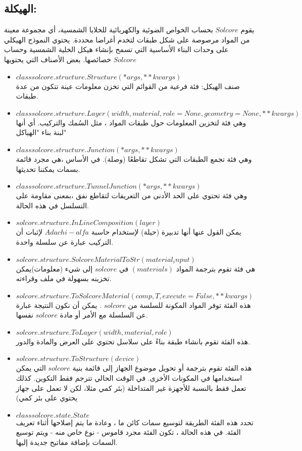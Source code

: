 \subsection{الهيكلة:}
يقوم $ Solcore $ بحساب الخواص الضوئية والكهربائية للخلايا الشمسية، أي مجموعة معينة من المواد مرصوصة على شكل طبقات لتخدم أغراضا محددة. يحتوي النموذج الهيكلي على وحدات البناء الأساسية التي تسمح بإنشاء هيكل الخلية الشمسية وحساب خصائصها.
بعض الأصناف التي يحتويها $ Solcore $ 
\begin{itemize}
	\item $ class solcore.structure.Structure(*args, **kwargs) $
	\\ صنف الهيكل: فئة فرعية من القوائم التي تخزن معلومات عينة تتكون من عدة طبقات.
	\item $ class solcore.structure.Layer(width, material, role=None, geometry=None, **kwargs) $
	\\وهي فئة لتخزين المعلومات حول طبقات المواد ، مثل السُمك والتركيب. أي أنها لبنة بناء "الهياكل"
	\item $ class solcore.structure.Junction(*args, **kwargs) $
	\\وهي فئة تجمع الطبقات التي تشكل تقاطعًا (وصلة). في الأساس ،هي مجرد قائمة بسمات يمكننا تحديثها.
	\item $ class solcore.structure.TunnelJunction(*args, **kwargs) $
	\\وهي فئة تحتوي على الحد الأدنى من التعريفات لتقاطع نفق ،بمعنى مقاومة على التسلسل في هذه الحالة.
	\item $ solcore.structure.InLineComposition(layer) $
	\\يمكن القول عنها أنها تدبيرة (حيلة) لإستخدام حاسبة $ Adachi-alfa $ لإثبات أن التركيب عبارة عن سلسلة واحدة.
	\item $ solcore.structure.SolcoreMaterialToStr(material_input) $
	\\هي فئة تقوم بترجمة المواد $ (materials) $ في $ solcore $ إلى شيء (معلومات)يمكن تخزينه بسهولة في ملف وقراءته.
	\item $ solcore.structure.ToSolcoreMaterial(comp, T, execute=False, **kwargs) $
	\\هذه الفئة توفر المواد المكونة للسلسة من $ solcore $ . يمكن أن نكون النتيجة عبارة عن السلسلة مع الأمر أو مادة $ solcore $ نفسها.
	\item $ solcore.structure.ToLayer(width, material, role) $
	\\هذه الفئة تقوم بانشاء طبقة بناءً على سلاسل تحتوي على العرض والمادة والدور.
	\item $ solcore.structure.ToStructure(device) $
	\\هذه الفئة تقوم بترجمة أو تحويل موضوع الجهاز إلى قائمة بنية $ solcore $ التي يمكن استخدامها في المكونات الأخرى. في الوقت الحالي تترجم فقط التكوين. كذلك تعمل فقط بالنسبة للأجهزة غير المتداخلة (بئر كمي مثلا، لكن لا تعمل على جهاز يحتوي على بئر كمي)
	\item $ class solcore.state.State $
	\\تحدد هذه الفئة الطريقة لتوسيع سمات كائن ما ، وعادة ما يتم إصلاحها أثناء تعريف الفئة. في هذه الحالة ، تكون الفئة مجرد قاموس - نوع خاص منه - ويتم توسيع السمات بإضافة مفاتيح جديدة إليها.
\end{itemize} 
